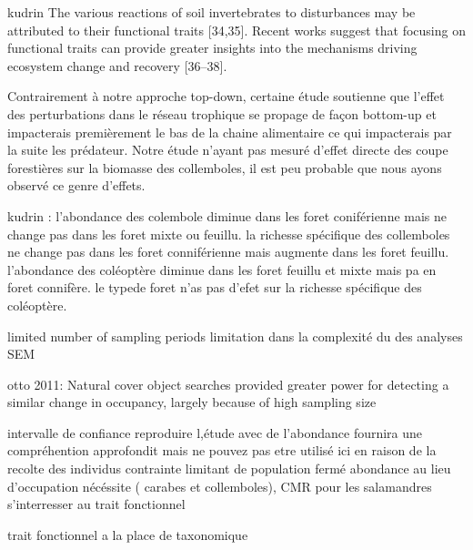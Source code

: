 
kudrin The various reactions of soil invertebrates to disturbances may be attributed to their functional traits [34,35]. 
Recent works suggest that focusing on functional traits can provide greater insights into the mechanisms driving ecosystem change and recovery [36–38].


Contrairement à notre approche top-down, certaine étude soutienne que l'effet des perturbations dans le réseau trophique se propage de façon bottom-up et impacterais premièrement le bas de la chaine alimentaire ce qui impacterais par la suite les prédateur.
Notre étude n'ayant pas mesuré d'effet directe des coupe forestières sur la biomasse des collemboles, il est peu probable que nous ayons observé ce genre d'effets. 


kudrin :
 l'abondance des colembole diminue dans les foret coniférienne mais ne change pas dans les foret mixte ou feuillu.
 la richesse spécifique des collemboles  ne change pas dans les foret conniférienne mais augmente dans les foret feuillu.
 l'abondance des coléoptère diminue dans les foret feuillu et mixte mais pa en foret connifère.
 le typede foret n'as pas d'efet sur la richesse spécifique des coléoptère.


 
  limited number of sampling periods
  limitation dans la complexité du des analyses SEM

  otto 2011:
  Natural cover object searches provided greater power for detecting a similar change in occupancy, largely because of high sampling size

    intervalle de confiance
  reproduire l,étude avec de l'abondance fournira une compréhention approfondit mais ne pouvez pas etre utilisé ici en raison de la recolte des individus
  contrainte limitant de population fermé
  abondance au lieu d'occupation nécéssite ( carabes et collemboles), CMR pour les salamandres
  s'interresser au trait fonctionnel 

  trait fonctionnel a la place de taxonomique


